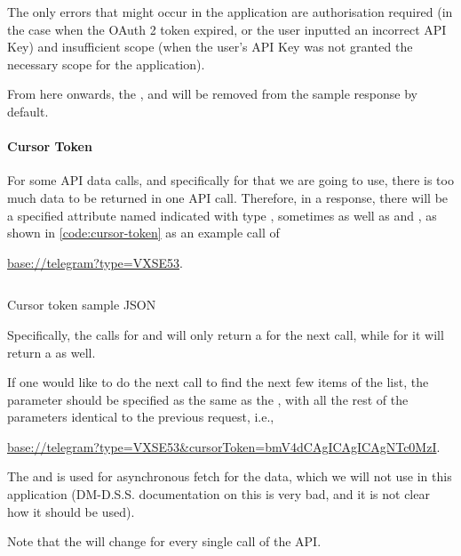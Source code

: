 The only errors that might occur in the application are  authorisation required (in the case when the OAuth 2 token expired, or the user inputted an incorrect API Key) and  insufficient scope (when the user's API Key was not granted the necessary scope for the application).

From here onwards, the ,  and  will be removed from the sample response by default.

\paragraph{Cursor Token}

For some API data calls, and specifically for  that we are going to use, there is too much data to be returned in one API call. Therefore, in a response, there will be a specified attribute named  indicated with type , sometimes as well as  and , as shown in \autoref{code:cursor-token} as an example call of
\begin{center}
    \url{base://telegram?type=VXSE53}.
\end{center}

\begin{listing}[htp]
    \inputminted{json}{code/CursorToken.json}
    \caption{Cursor token sample JSON}
    \label{code:cursor-token}
\end{listing}

Specifically, the calls for  and  will only return a  for the next call, while for  it will return a  as well.

If one would like to do the next call to find the next few items of the list, the  parameter should be specified as the same as the , with all the rest of the parameters identical to the previous request, i.e.,
\begin{center}
    \url{base://telegram?type=VXSE53&cursorToken=bmV4dCAgICAgICAgNTc0MzI}.
\end{center}

The  and  is used for asynchronous fetch for the data, which we will not use in this application (DM-D.S.S. documentation on this is very bad, and it is not clear how it should be used).

Note that the  will change for every single call of the API.

